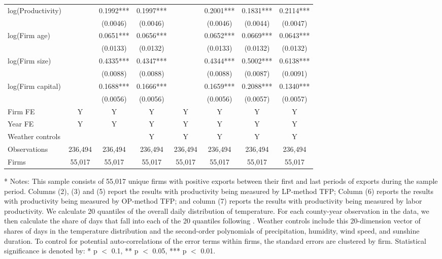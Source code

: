 \documentclass[12pt]{article}
\begin{document}
\begin{table}[H]
{\begin{tabular}{l*{7}{c}}
      log(Productivity)             &             &0.1992***&0.1997***  &              &   0.2001***   &0.1831***& 0.2114***\\
                           &             &(0.0046)&(0.0046)   &               &  (0.0046)      &(0.0044)& (0.0047)\\
      log(Firm age)        &             &0.0651***&0.0656***  &              &  0.0652***    &0.0669***& 0.0643***\\
                           &              &(0.0133)&(0.0132)   &              &  (0.0133)     &(0.0132)& (0.0132)\\
      log(Firm size)       &             &0.4335***&0.4347***  &              &  0.4344***    &0.5002***& 0.6138***\\
                           &              &(0.0088)&(0.0088)   &              &  (0.0088)     &(0.0087)&(0.0091)\\
      log(Firm capital)    &             &0.1688***&0.1666***  &              &  0.1659***    &0.2088***&0.1340***\\
                           &              &(0.0056)&(0.0056)   &              &  (0.0056)     &(0.0057)&(0.0057)\\
      \hline
      Firm FE          &Y&Y&Y&Y&Y&Y&Y\\
      Year FE          &Y&Y&Y&Y&Y&Y&Y\\
      Weather controls & & &Y&Y&Y&Y&Y\\
      \hline
      Observations   &236,494&236,494&236,494&236,494 &236,494 &236,494&236,494\\
      Firms          &55,017 &55,017&55,017 &55,017 &55,017 &55,017&55,017\\
      \hline\hline
    \end{tabular}
    }
    \begin{tablenotes}
      \item[*] \small Notes: This sample consists of 55,017 unique firms with positive exports between their first and last periods of exports during the sample period. Columns (2), (3) and (5) report the results with productivity being measured by LP-method TFP; Column (6) reports the results with productivity being measured by OP-method TFP; and column (7) reports the results with productivity being measured by labor productivity. We calculate 20 quantiles of the overall daily distribution of temperature. For each county-year observation in the data, we then calculate the share of days that fall into each of the 20 quantiles following \citep{deschenes2017defensive}. Weather controls include this 20-dimension vector of shares of days in the temperature distribution and the second-order polynomials of precipitation, humidity, wind speed, and sunshine duration. To control for potential auto-correlations of the error terms within firms, the standard errors are clustered by firm. Statistical significance is denoted by: * p $<$ 0.1, ** p $<$ 0.05, *** p $<$ 0.01.
    \end{tablenotes}
  \end{table}
\end{document}
